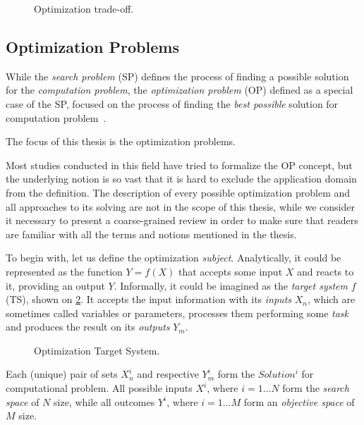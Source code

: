 \begin{figure}
	\centering
	
	\caption{Optimization trade-off.}
	\label{bg:pic:Optimization tradeoff}
\end{figure}

\subsection{Optimization Problems}\label{BG: subsection OPs}
While the \emph{search problem} (SP) defines the process of finding a possible solution for the \emph{computation problem}, the \emph{optimization problem} (OP) defined as a special case of the SP, focused on the process of finding the \emph{best possible} solution for computation problem~\cite{goldreich2010p}.

The focus of this thesis is the optimization problems.

Most studies conducted in this field have tried to formalize the OP concept, but the underlying notion is so vast that it is hard to exclude the application domain from the definition. The description of every possible optimization problem and all approaches to its solving are not in the scope of this thesis, while we consider it necessary to present a coarse-grained review in order to make sure that readers are familiar with all the terms and notions mentioned in the thesis. 

To begin with, let us define the optimization \emph{subject}. Analytically, it could be represented as the function $Y = f(X)$ that accepts some input $X$ and reacts to it, providing an output $Y$. Informally, it could be imagined as the \emph{target system} $f$ (TS), shown on \cref{bg:pic:Target System}. It accepts the input information with its \emph{inputs} $X_n$, which are sometimes called variables or parameters, processes them performing some \emph{task} and produces the result on its \emph{outputs} $Y_m$.

\begin{figure}[!h]
	\centering
	
	\caption{Optimization Target System.}
	\label{bg:pic:Target System}
\end{figure}

Each (unique) pair of sets $X_n^i$ and respective $Y_m^i$ form the $Solution^i$ for computational problem.
All possible inputs $X^i$, where $i=1...N$ form the \emph{search space} of $N$ size, while all outcomes $Y^i$, where $i=1...M$ form an \emph{objective space} of $M$ size.

